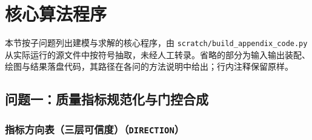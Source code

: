 \clearpage
\section{核心算法程序}
\label{app:code}

本节按子问题列出建模与求解的核心程序，由 \texttt{scratch/build\_appendix\_code.py}
从实际运行的源文件中按符号抽取，未经人工转录。省略的部分为输入输出装配、
绘图与结果落盘代码，其路径在各问的方法说明中给出；行内注释保留原样。

\subsection{问题一：质量指标规范化与门控合成}

\subsubsection*{指标方向表（三层可信度）（\texttt{DIRECTION}）}

